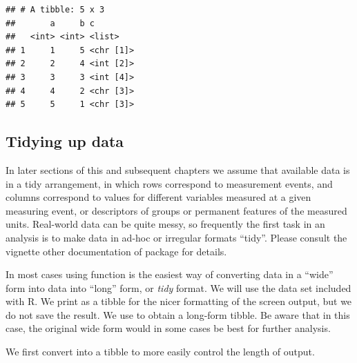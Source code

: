 \documentclass[krantz2]{krantz}\usepackage{knitr}%
\begin{document}
\begin{knitrout}\footnotesize
{}\color{fgcolor}\begin{kframe}
\begin{alltt}
\hlstd{(} \hlstd{=} \hlopt{:}\hlstd{,}  \hlstd{=} \hlopt{:}\hlstd{,}  \hlstd{=} \hlstd{(}\hlstd{,} \hlopt{:}\hlstd{,} \hlopt{:}\hlstd{, letters[}\hlopt{:}\hlstd{], letters[}\hlopt{:}\hlstd{]))}
\end{alltt}
\begin{verbatim}
## # A tibble: 5 x 3
##       a     b c        
##   <int> <int> <list>   
## 1     1     5 <chr [1]>
## 2     2     4 <int [2]>
## 3     3     3 <int [4]>
## 4     4     2 <chr [3]>
## 5     5     1 <chr [3]>
\end{verbatim}
\end{kframe}
\end{knitrout}

\subsection{Tidying up data}

In later sections of this and subsequent chapters we assume that available data is in a tidy arrangement, in which rows correspond to measurement events, and columns correspond to values for different variables measured at a given measuring event, or descriptors of groups or permanent features of the measured units. Real-world data can be quite messy, so frequently the first task in an analysis is to make data in ad-hoc or irregular formats ``tidy''. Please consult the vignette other documentation of package  for details.

In most cases using function  is the easiest way of converting data in a ``wide'' form into data into ``long'' form, or \emph{tidy} format. We will use the  data set included with R. We print  as a tibble for the nicer formatting of the screen output, but we do not save the result. We use  to obtain a long-form tibble. Be aware that in this case, the original wide form would in some cases be best for further analysis.

We first convert  into a tibble to more easily control the length of output.
\end{document}

